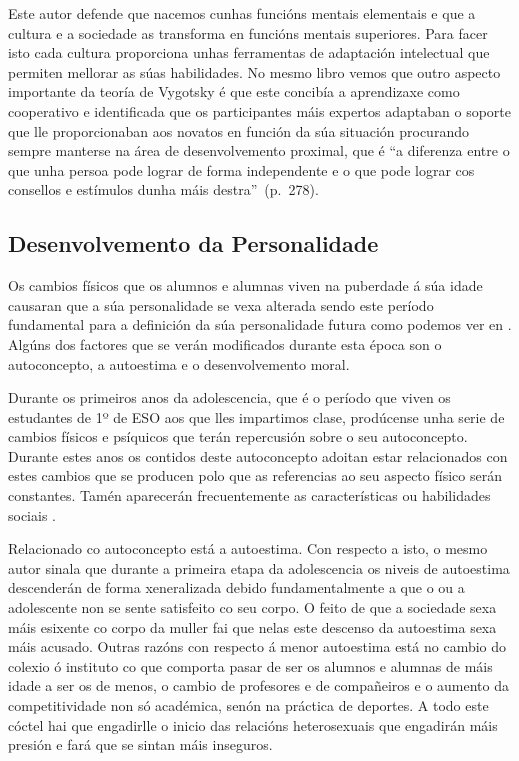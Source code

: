 Este autor defende que nacemos cunhas funcións mentais elementais e que a cultura e a sociedade as transforma en funcións mentais superiores. Para facer isto cada cultura proporciona unhas ferramentas de adaptación intelectual que permiten mellorar as súas habilidades. No mesmo libro vemos que outro aspecto importante da teoría de Vygotsky é que este concibía a aprendizaxe como cooperativo e identificada que os participantes máis expertos adaptaban o soporte que lle proporcionaban aos novatos en función da súa situación procurando sempre manterse na área de desenvolvemento proximal, que é ``a diferenza entre o que unha persoa pode lograr de forma independente e o que pode lograr cos consellos e estímulos dunha máis destra''~(p.~278).

\subsection{Desenvolvemento da Personalidade}
Os cambios físicos que os alumnos e alumnas viven na puberdade á súa idade causaran que a súa personalidade se vexa alterada sendo este período fundamental para a definición da súa personalidade futura como podemos ver en . Algúns dos factores que se verán modificados durante esta época son o autoconcepto, a autoestima
 e o desenvolvemento moral.

Durante os primeiros anos da adolescencia, que é o período que viven os estudantes de 1º de ESO aos que lles impartimos clase, prodúcense unha serie de cambios físicos e psíquicos que terán repercusión sobre o seu autoconcepto. Durante estes anos os contidos deste autoconcepto adoitan estar relacionados con estes cambios que se producen polo que as referencias ao seu aspecto físico serán constantes. Tamén aparecerán frecuentemente as características ou habilidades sociais \cite{personalidadcoll}.

Relacionado co autoconcepto está a autoestima. Con respecto a isto, o mesmo autor sinala que durante a primeira etapa da adolescencia os niveis de autoestima descenderán de forma xeneralizada debido fundamentalmente a que o ou a adolescente non se sente satisfeito co seu corpo. O feito de que a sociedade sexa máis esixente co corpo da muller fai que nelas este descenso da autoestima sexa máis acusado. Outras razóns con respecto á menor autoestima está no cambio do colexio ó instituto co que comporta pasar de ser os alumnos e alumnas de máis idade a ser os de menos, o cambio de profesores e de compañeiros e o aumento da competitividade non só académica, senón na práctica de deportes. A todo este cóctel hai que engadirlle o inicio das relacións heterosexuais que engadirán máis presión e fará que se sintan máis inseguros.

